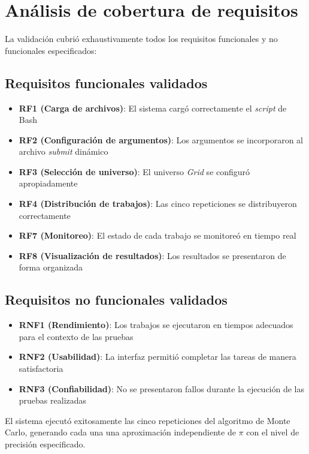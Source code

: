 \section{Análisis de cobertura de requisitos}
\noindent

La validación cubrió exhaustivamente todos los requisitos funcionales y no funcionales especificados:

\subsection{Requisitos funcionales validados}
\noindent

\begin{itemize}
	\item \textbf{RF1 (Carga de archivos)}: El sistema cargó correctamente el \textit{script} de Bash
	\item \textbf{RF2 (Configuración de argumentos)}: Los argumentos se incorporaron al archivo \textit{submit} dinámico
	\item \textbf{RF3 (Selección de universo)}: El universo \textit{Grid} se configuró apropiadamente
	\item \textbf{RF4 (Distribución de trabajos)}: Las cinco repeticiones se distribuyeron correctamente
	\item \textbf{RF7 (Monitoreo)}: El estado de cada trabajo se monitoreó en tiempo real
	\item \textbf{RF8 (Visualización de resultados)}: Los resultados se presentaron de forma organizada
\end{itemize}

\subsection{Requisitos no funcionales validados}
\noindent

\begin{itemize}
	\item \textbf{RNF1 (Rendimiento)}: Los trabajos se ejecutaron en tiempos adecuados para el contexto de las pruebas
	\item \textbf{RNF2 (Usabilidad)}: La interfaz permitió completar las tareas de manera satisfactoria
	\item \textbf{RNF3 (Confiabilidad)}: No se presentaron fallos durante la ejecución de las pruebas realizadas
\end{itemize}

El sistema ejecutó exitosamente las cinco repeticiones del algoritmo de Monte Carlo, generando cada una una aproximación independiente de $\pi$ con el nivel de precisión especificado.

